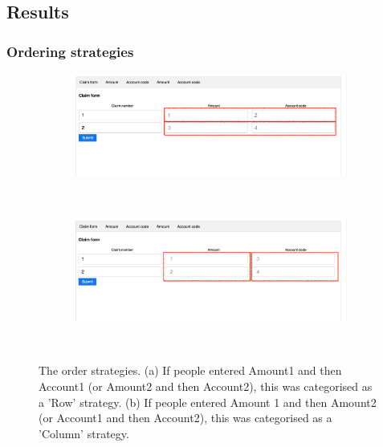 
\subsection{Results}

\subsubsection{Ordering strategies}
\begin{figure}[!ht]
    \centering
    \begin{subfigure}[b]{0.5\textwidth}
        \includegraphics[width=\textwidth]{images/ch34/ch34_4-roworderstr.png}
        \caption{}
        \label{fig:ch34_4-roworderstr}
    \end{subfigure}
    ~ %
    \begin{subfigure}[b]{0.5\textwidth}
        \includegraphics[width=\textwidth]{images/ch34/ch34_4-columnorderstr.png}
        \caption{}
        \label{fig:columnorderstr}
    \end{subfigure}
    ~ %
    \caption{The order strategies. (a)  If people entered Amount1 and then Account1 (or Amount2 and then Account2), this was categorised as a 'Row' strategy. (b) If people entered Amount 1 and then Amount2 (or Account1 and then Account2), this was categorised as a 'Column' strategy.}\label{fig:ch34_4-orderstr}
\end{figure}


